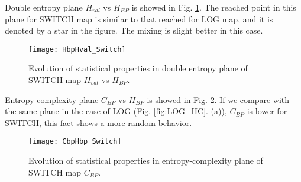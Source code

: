 Double entropy plane $H_{val}$ vs $H_{BP}$ is showed in Fig. \ref{fig:SWITCH_HH}.
The reached point in this plane for SWITCH map is similar to that reached for LOG map, and it is denoted by a star in the figure.
The mixing is slight better in this case.

\begin{figure}
	\centering
	\texttt{[image: HbpHval\_Switch]}
	\caption{Evolution of statistical properties in double entropy plane of SWITCH map $H_{val}$ vs $H_{BP}$.}
	\label{fig:SWITCH_HH}
\end{figure}

Entropy-complexity plane $C_{BP}$ vs $H_{BP}$ is showed in Fig. \ref{fig:SWITCH_HC}.
If we compare with the same plane in the case of LOG (Fig. \ref{fig:LOG_HC}. (a)), $C_{BP}$ is lower for SWITCH, this fact shows a more random behavior.

\begin{figure}
	\centering
	\texttt{[image: CbpHbp\_Switch]}
	\caption{Evolution of statistical properties in entropy-complexity plane of SWITCH map $C_{BP}$.}
	\label{fig:SWITCH_HC}
\end{figure}